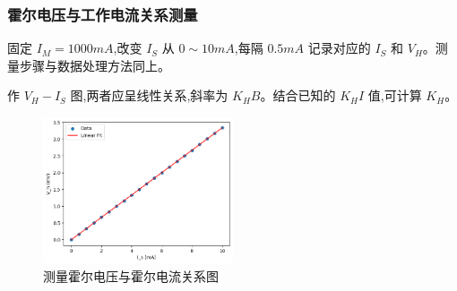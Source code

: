 \documentclass[UTF8]{ctexart}
\begin{document}
    \subsubsection{霍尔电压与工作电流关系测量}
    固定 $I_M=1000mA$,改变 $I_S$ 从 $0\sim10mA$,每隔 $0.5mA$ 记录对应的 $I_S$ 和 $V_H$。测量步骤与数据处理方法同上。
    
    作 $V_H-I_S$ 图,两者应呈线性关系,斜率为 $K_H B$。结合已知的 $K_H I$ 值,可计算 $K_H$。
    
    \begin{figure}[htbp]
        \centering
        \includegraphics[width=0.5\textwidth]{hall_effect_Is.png}
        \caption{测量霍尔电压与霍尔电流关系图}
        \label{fig:hall_effect_Is}
    \end{figure}
    
\end{document}
